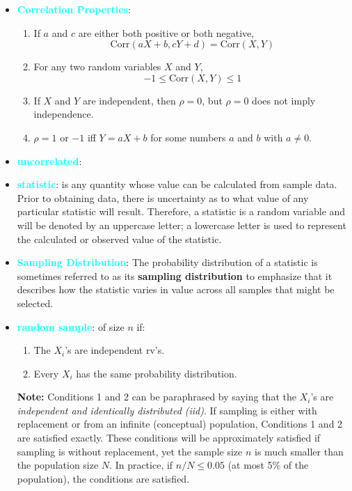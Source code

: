 \documentclass{report}
\begin{document}
\begin{itemize}
        \item \textbf{\textcolor{cyan}{Correlation Properties}}:
            \begin{enumerate}
                \item If \( a \) and \( c \) are either both positive or both negative,
                    \[
                        \text{Corr}(aX + b, cY + d) = \text{Corr}(X, Y)
                    \]
                \item For any two random variables \( X \) and \( Y \),
                    \[
                        -1 \leq \text{Corr}(X, Y) \leq 1
                    \]
                \item If \( X \) and \( Y \) are independent, then \( \rho = 0 \), but \( \rho = 0 \) does not imply independence.
                \item \( \rho = 1 \) or \( -1 \) iff \( Y = aX + b \) for some numbers \( a \) and \( b \) with \( a \neq 0 \).
            \end{enumerate}
        \item \textbf{\textcolor{cyan}{uncorrelated}}:
        \item \textbf{\textcolor{cyan}{statistic}}: is any quantity whose value can be calculated from sample data.
            Prior to obtaining data, there is uncertainty as to what value of any particular
            statistic will result. Therefore, a statistic is a random variable and will be
            denoted by an uppercase letter; a lowercase letter is used to represent the
            calculated or observed value of the statistic.
        \item \textbf{\textcolor{cyan}{Sampling Distribution}}: The probability distribution of a statistic is sometimes
            referred to as its \textbf{sampling distribution} to emphasize that it describes how the statistic varies in value across all samples that might be selected.
        \item \textbf{\textcolor{cyan}{random sample}}: of size \( n \) if:
            \begin{enumerate}
                \item The \( X_i \)'s are independent rv's.
                \item Every \( X_i \) has the same probability distribution.
            \end{enumerate}
            \bigbreak \noindent 
            \textbf{Note:} Conditions 1 and 2 can be paraphrased by saying that the \(X_i\)'s are \textit{independent and identically distributed (iid)}. If sampling is either with replacement or from an infinite (conceptual) population, Conditions 1 and 2 are satisfied exactly. These conditions will be approximately satisfied if sampling is without replacement, yet the sample size \(n\) is much smaller than the population size \(N\). In practice, if \(n/N \leq 0.05\) (at most 5\% of the population), the conditions are satisfied.

\end{itemize}
\end{document}
